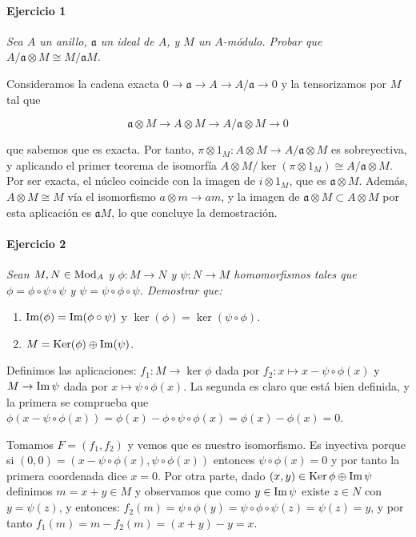\documentclass[./ejercicios.tex]{subfiles}
\begin{document}
\paragraph{Ejercicio 1} \textit{ Sea $A$ un anillo, $\mathfrak a$ un ideal de $A$, y $M$ un $A$-módulo. Probar que $A/\mathfrak a \otimes M \cong M/\mathfrak a M $.}

Consideramos la cadena exacta $0\longrightarrow \mathfrak a \longrightarrow A \longrightarrow A/\mathfrak a \longrightarrow 0$ y la tensorizamos por $M$ tal que

\[ \mathfrak a \otimes M \longrightarrow A\otimes M \longrightarrow A/\mathfrak a \otimes M \longrightarrow 0 \]

que sabemos que es exacta. Por tanto, $\pi \otimes 1_M: A \otimes M \to A/\mathfrak a \otimes M $ es sobreyectiva, y aplicando el primer teorema de isomorfía $A \otimes M / \ker (\pi \otimes 1_M) \cong A/\mathfrak a \otimes M $. Por ser exacta, el núcleo coincide con la imagen de $i \otimes 1_M$, que es $\mathfrak a \otimes M$. Además, $A\otimes M \cong M$ vía el isomorfismo $a\otimes m \to am$, y la imagen de $\mathfrak a \otimes M \subset A\otimes M$ por esta aplicación es $\mathfrak a M$, lo que concluye la demostración.

\paragraph{Ejercicio 2} \textit{Sean $M, N \in \operatorname{Mod}_A$ y $\phi:M\to N$ y $\psi:N\to M$ homomorfismos tales que $\phi = \phi \circ \psi \circ \psi$ y $\psi = \psi \circ \phi \circ \psi$. Demostrar que:}

\begin{enumerate}
  \item $\operatorname{Im}(\phi) = \operatorname{Im} (\phi \circ \psi)$ y $\ker (\phi) = \ker(\psi \circ \phi)$.
  \item $M= \operatorname{Ker}(\phi)\oplus \operatorname{Im}(\psi)$.
\end{enumerate}

Definimos las aplicaciones: $f_1:M\to \ker \phi$ dada por $f_2:x\mapsto x-\psi \circ \phi (x)$ y $M\to \operatorname{Im} \psi$ dada por $x\mapsto \psi \circ \phi (x)$. La segunda es claro que está bien definida, y la primera se comprueba que $\phi(x-\psi\circ \phi(x)) = \phi(x)-\phi\circ \psi \circ \phi(x) = \phi(x)-\phi(x) = 0$.

Tomamos $F=(f_1,f_2)$ y vemos que es nuestro isomorfismo. Es inyectiva porque si $(0,0) = (x-\psi \circ \phi (x), \psi \circ \phi (x))$ entonces $\psi \circ \phi (x) = 0$ y por tanto la primera coordenada dice $x=0$. Por otra parte, dado $(x,y)\in \operatorname{Ker} \phi \oplus \operatorname{Im} \psi$ definimos $m=x+y \in M$ y observamos que como $y\in \operatorname{Im} \psi$ existe $z\in N$ con $y=\psi(z)$, y entonces: $f_2(m) =  \psi \circ \phi (y) = \psi \circ \phi \circ \psi(z) = \psi (z) = y $, y por tanto $f_1(m) = m - f_2(m) = (x+y)-y = x$.
\end{document}
